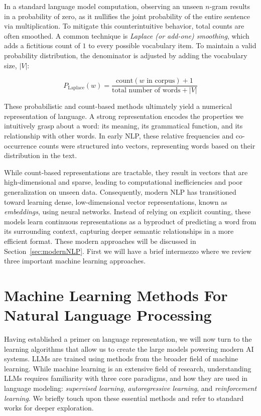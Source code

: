 In a standard language model computation, observing an unseen $n$-gram results in a probability of zero, as it nullifies the joint probability of the entire sentence via multiplication. To mitigate this counterintuitive behavior, total counts are often smoothed. A common technique is \emph{Laplace (or add-one) smoothing}, which adds a fictitious count of $1$ to every possible vocabulary item. To maintain a valid probability distribution, the denominator is adjusted by adding the vocabulary size, $|V|$:

\begin{equation}
\label{eq:mle-word-prob-laplace}
    P_{\text{Laplace}}(w) = \frac{\text{count}(w \text{ in corpus}) + 1}{\text{total number of words} + |V|}
\end{equation}

These probabilistic and count-based methods ultimately yield a numerical representation of language. A strong representation encodes the properties we intuitively grasp about a word: its meaning, its grammatical function, and its relationship with other words. In early NLP, these relative frequencies and co-occurrence counts were structured into vectors,  representing words based on their distribution in the text. 

While count-based representations are tractable, they result in vectors that are  high-dimensional and sparse, leading to computational inefficiencies and poor generalization on unseen data. Consequently, modern NLP has transitioned toward learning dense, low-dimensional vector representations, known as \textit{embeddings}, using neural networks. Instead of relying on explicit counting, these models learn continuous representations as a byproduct of predicting a word from its surrounding context, capturing deeper semantic relationships in a  more efficient format.
These modern approaches will be discussed in Section~\ref{sec:modernNLP}. First we will have a brief intermezzo where we review three important machine learning approaches.

\section{Machine Learning Methods For Natural Language Processing}
\label{sec:machinelearning}
Having  established a primer on language representation, we will now turn to the learning algorithms that allow us to create the large models powering modern AI systems. LLMs are trained using methods from the broader field of machine learning. While machine learning is an extensive field of research,  understanding LLMs requires familiarity with three core paradigms, and how they are used in language modeling: \emph{supervised learning},  \emph{autoregressive learning}, and \emph{reinforcement learning}. We briefly touch upon these essential methods and refer to standard works for deeper exploration.

